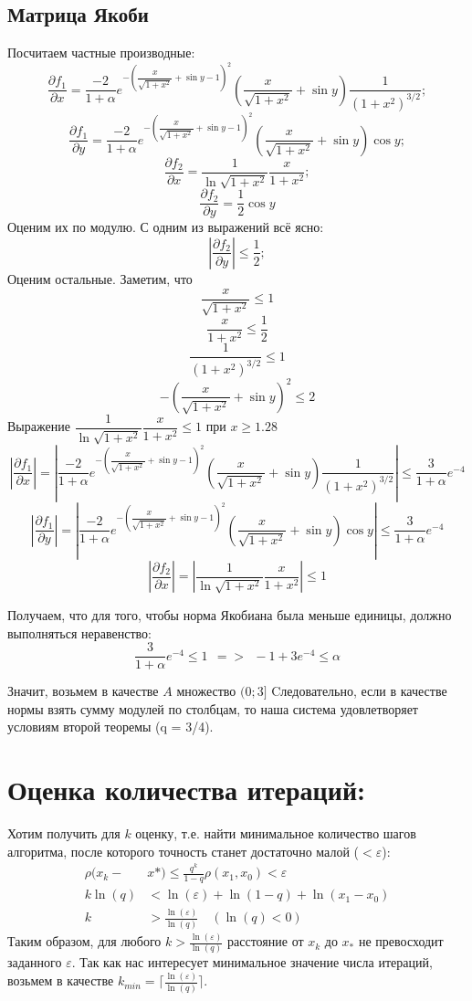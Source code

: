 \documentclass[a4paper,12pt]{article}
\begin{document}
\subsection{Матрица Якоби}
Посчитаем частные производные:
\[\dfrac{\partial f_1}{\partial x} = \dfrac{-2}{1+\alpha}  e^{-\left(\dfrac{x}{\sqrt{1+x^2}} + \sin{y} - 1\right)^2} \left(\dfrac{x}{\sqrt{1+x^2}} + \sin{y}\right) \dfrac{1}{(1+x^2)^{3/2}}; \]
\[\dfrac{\partial f_1}{\partial y} = \dfrac{-2}{1+\alpha}  e^{-\left(\dfrac{x}{\sqrt{1+x^2}} + \sin{y} - 1\right)^2} \left(\dfrac{x}{\sqrt{1+x^2}} + \sin{y}\right) \cos{y};\]
\[\dfrac{\partial f_2}{\partial x} = \dfrac{1}{\ln{\sqrt{1+x^2}}}\dfrac{x}{1+x^2};\] 
\[\dfrac{\partial f_2}{\partial y} = \dfrac{1}{2} \cos{y}\]
Оценим их по модулю. С одним из выражений всё ясно:
\[\left|\dfrac{\partial f_2}{\partial y}\right| \le \frac12; \]
Оценим остальные. Заметим, что
\[\dfrac{x}{\sqrt{1+x^2}} \le 1\]   
\[\dfrac{x}{1+x^2} \le \dfrac12\]   
\[\dfrac{1}{\left(1+x^2\right)^{3/2}} \le 1\]
\[-\left(\dfrac{x}{\sqrt{1+x^2}} + \sin{y}\right)^2 \le 2\]
Выражение $\dfrac{1}{\ln{\sqrt{1+x^2}}}\dfrac{x}{1+x^2} \leq 1$ при $x \geq 1.28$
\[\left|\frac{\partial f_1}{\partial x}\right| = \left| \dfrac{-2}{1+\alpha}  e^{-\left(\dfrac{x}{\sqrt{1+x^2}} + \sin{y} - 1\right)^2} \left(\dfrac{x}{\sqrt{1+x^2}} + \sin{y}\right) \dfrac{1}{(1+x^2)^{3/2}}\right| \le \frac{3}{1+\alpha} e^{-4}\]
\[\left|\frac{\partial f_1}{\partial y}\right| = \left| \dfrac{-2}{1+\alpha}  e^{-\left(\dfrac{x}{\sqrt{1+x^2}} + \sin{y} - 1\right)^2} \left(\dfrac{x}{\sqrt{1+x^2}} + \sin{y}\right) \cos{y}\right| \le \frac{3}{1+\alpha} e^{-4}\]
\[\left|\frac{\partial f_2}{\partial x}\right| = \left| \dfrac{1}{\ln{\sqrt{1+x^2}}}\dfrac{x}{1+x^2}\right| \le 1\]

Получаем, что для того, чтобы норма Якобиана была меньше единицы, должно выполняться неравенство:
\[\frac{3}{1+\alpha} e^{-4} \le 1 \   \ => \   \ -1 + 3e^{-4} \le \alpha\]

Значит, возьмем в качестве $A$ множество $(0; 3]$
Cледовательно, если в качестве нормы взять сумму модулей по столбцам, то наша система удовлетворяет условиям второй теоремы (q = 3/4).


\section {Оценка количества итераций:}
Хотим получить для $k$ оценку, т.е. найти минимальное количество шагов алгоритма, после которого точность станет достаточно малой ($<\varepsilon$):
\large
$$
\begin{aligned}
\rho(x_k - &x*) \leq \frac{q^k}{1-q}\rho(x_1,x_0) < \varepsilon\\
k \ln(q) &< \ln(\varepsilon)+\ln(1-q)+\ln(x_1-x_0)\\
k  &> \frac{\ln(\varepsilon)}{\ln(q)} \quad (\ln(q) < 0)
\end{aligned}
$$
Таким образом, для любого $k > \frac{\ln(\varepsilon)}{\ln(q)}$ расстояние от $x_k$ до $x_*$ не превосходит заданного $\varepsilon$. Так как нас интересует минимальное значение числа итераций, возьмем в качестве $k_{min} = \lceil \frac{\ln(\varepsilon)}{\ln(q)} \rceil$.
\end{document}
